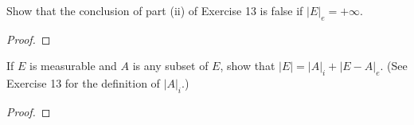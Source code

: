 \begin{problem}
  Show that the conclusion of part (ii) of Exercise 13 is false if
  $\left|E\right|_e=+\infty$.
\end{problem}
\begin{proof}
\end{proof}
\newpage


\begin{problem}
If $E$ is measurable and $A$ is any subset of $E$, show that
$\left|E\right|=\left|A\right|_i+\left|E-A\right|_e$. (See Exercise 13 for
the definition of $\left|A\right|_i$.)
\end{problem}
\begin{proof}
\end{proof}

